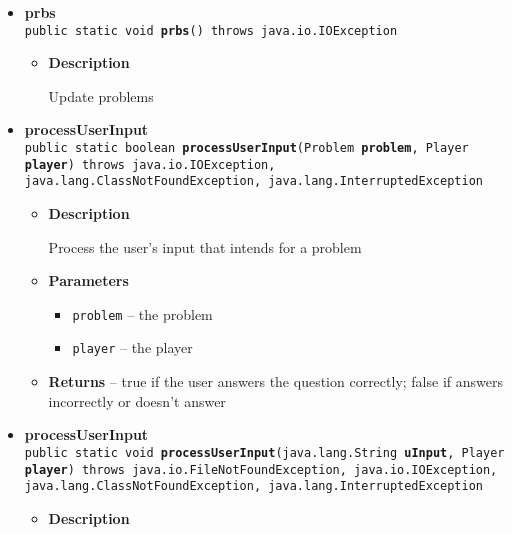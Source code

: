 {{{{{{\begin{itemize}
{\begin{itemize}
{Update location information from the csv file
}
\end{itemize}
}%
\item{ 
{\bf  prbs}\\
\texttt{public static void\ {\bf  prbs}() throws java.io.IOException
\label{personOfInterest.Game.prbs()}}%
\begin{itemize}
\item{
{\bf  Description}

Update problems
}
\end{itemize}
}%
\item{ 
{\bf  processUserInput}\\
\texttt{public static boolean\ {\bf  processUserInput}(\texttt{Problem} {\bf  problem},
\texttt{Player} {\bf  player}) throws java.io.IOException, java.lang.ClassNotFoundException, java.lang.InterruptedException
\label{personOfInterest.Game.processUserInput(personOfInterest.Problem, personOfInterest.Player)}}%
\begin{itemize}
\item{
{\bf  Description}

Process the user's input that intends for a problem
}
\item{
{\bf  Parameters}
  \begin{itemize}
   \item{
\texttt{problem} -- the problem}
   \item{
\texttt{player} -- the player}
  \end{itemize}
}%
\item{{\bf  Returns} -- 
true if the user answers the question correctly; false if answers incorrectly or doesn't answer 
}%
\end{itemize}
}%
\item{ 
{\bf  processUserInput}\\
\texttt{public static void\ {\bf  processUserInput}(\texttt{java.lang.String} {\bf  uInput},
\texttt{Player} {\bf  player}) throws java.io.FileNotFoundException, java.io.IOException, java.lang.ClassNotFoundException, java.lang.InterruptedException
\label{personOfInterest.Game.processUserInput(java.lang.String, personOfInterest.Player)}}%
\begin{itemize}
\item{
{\bf  Description}

}
\end{itemize}}
\end{itemize}}}}}}}

